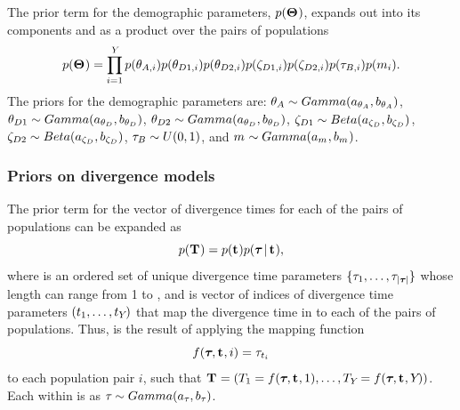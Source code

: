 \documentclass[letterpaper,12pt]{article}
\begin{document}
\begin{linenumbers}
\begin{linenomath}
The prior term for the demographic parameters, $p(\mathbf{\Theta_{}})$,
expands out into its components and as a product over the \npairs{}
pairs of populations
\begin{equation}
    p(\demographicParamVector) =
    \prod_{i=1}^{\npairs{}}
    p(\ancestralTheta{i})
    p(\descendantTheta{1}{i})
    p(\descendantTheta{2}{i})
    p(\bottleScalar{1}{i})
    p(\bottleScalar{2}{i})
    p(\bottleTime{i})
    p(\migrationRate{i}).
    \label{eq:demographicPrior}
\end{equation}
The priors for the demographic parameters are:
$\ancestralTheta{} \sim Gamma(\gammaShape{\ancestralTheta{}},
\gammaScale{\ancestralTheta{}})$,
$\descendantTheta{1}{} \sim Gamma(\gammaShape{\descendantTheta{}{}},
\gammaScale{\descendantTheta{}{}})$,
$\descendantTheta{2}{} \sim Gamma(\gammaShape{\descendantTheta{}{}},
\gammaScale{\descendantTheta{}{}})$,
$\bottleScalar{1}{} \sim Beta(\betaA{\bottleScalar{}{}},
\betaB{\bottleScalar{}{}})$,
$\bottleScalar{2}{} \sim Beta(\betaA{\bottleScalar{}{}},
\betaB{\bottleScalar{}{}})$,
$\bottleTime{} \sim U(0, 1)$,
and
$m_{} \sim Gamma(a_{m_{}},
b_{m_{}})$.
\end{linenomath}

\subsubsection*{Priors on divergence models}
\begin{linenomath}
The prior term for the vector of divergence times for each of
the \npairs{} pairs of populations can be expanded as
\begin{equation}
    p(\mathbf{T_{}}) = p(\mathbf{t_{}})p(\boldsymbol{\tau_{}} \,|\, \mathbf{t_{}}),
    \label{eq:divModelPrior}
\end{equation}
where \divTimeVector is an ordered set of unique divergence time parameters
$\{\tau_{1}, \ldots, \tau_{\lvert \boldsymbol{\tau_{}} \rvert}\}$ whose length
\divTimeNum can range from 1 to \npairs{},
and \divTimeIndexVector is vector of indices of divergence time parameters 
$(t_{1}, \ldots, t_{Y_{}})$
that map the divergence time in \divTimeVector to each of the \npairs{}
pairs of populations.
Thus, \divTimeMapVector is the result of applying the mapping function
\begin{equation}
    f(\boldsymbol{\tau_{}}, \mathbf{t_{}}, i) = \tau_{t_{i}}
    \label{eq:divTimeMapFunction}
\end{equation}
to each population pair $i$, such that
$\mathbf{T_{}} = (T_{1} = f(\boldsymbol{\tau_{}}, \mathbf{t_{}},
1), \ldots, T_{Y_{}} = f(\boldsymbol{\tau_{}}, \mathbf{t_{}},
Y_{}))$.
Each \divTime{} within \divTimeVector is \iid as
$\tau_{} \sim Gamma(a_{\tau_{}}, b_{\tau_{}})$.
\end{linenomath}


\end{linenumbers}
\end{document}
